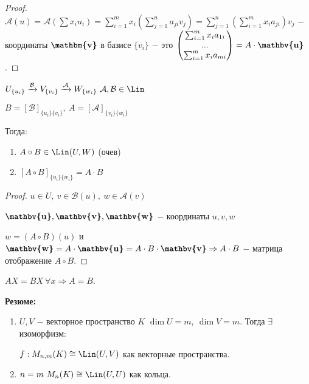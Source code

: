 \begin{proof}
    $\mathcal{A}(u)=\mathcal{A}(\sum 
x_iu_i)=\sum_{i=1}^mx_i(\sum_{j=1}^na_{ji}v_j)=\sum_{j=1}^n(\sum_{i=1}^mx_ia_{ji})v_j$ 
$-$ координаты $\textbf{\mathbm{v}}$ в базисе $\{v_i\}$ $-$ это 
$\begin{pmatrix}
        \sum_{i=1}^mx_ia_{1i} \\
        ... \\
        \sum_{i=1}^mx_ia_{mi}
    \end{pmatrix}=A\cdot \textbf{\mathbv{u}}$.
\end{proof}

\begin{corollary}
    
$U_{\{u_i\}}\xrightarrow{\mathcal{B}}V_{\{v_i\}}\xrightarrow{\mathcal{A}}W_{\{w_i\}}\ 
\mathcal{A}, \mathcal{B}\in \Lin$

    $B=[\mathcal{B}]_{\{u_i\}\{v_i\}},\ A=[\mathcal{A}]_{\{v_i\}\{w_i\}}$

    Тогда:\begin{enumerate}
        \item $A\circ B\in \Lin(U, W)$ (очев)
        \item $[A\circ B]_{\{u_i\}\{w_i\}}=A\cdot B$
    \end{enumerate}
\end{corollary}

\begin{proof}
    $u\in U,\ v\in \mathcal{B}(u),\ w\in \mathcal{A}(v)$

    $\textbf{\mathbv{u}}, \textbf{\mathbv{v}}, \textbf{\mathbv{w}}$ $-$ 
координаты $u,v,w$

    $w=(A \circ B)(u)$ и $\textbf{\mathbv{w}}=A\cdot 
\textbf{\mathbv{u}}=A\cdot B\cdot \textbf{\mathbv{v}}\Rightarrow A\cdot B$ 
$-$ матрица отображение $A\circ B$. 
\end{proof}

\begin{statement}
    $AX=BX\ \forall x\Rightarrow A=B$.
\end{statement}


\textbf{Резюме:}
\begin{enumerate}
    \item $U, V$ $-$ векторное пространство $K$ $\dim U=m,\ \dim V=m$. 
Тогда $\exists$ изоморфизм:

    $f:M_{n,m}(K)\cong \Lin (U, V)$ как векторные пространства.
    \item $n=m\ M_n(K)\cong \Lin (U, U)$ как кольца.
\end{enumerate}

